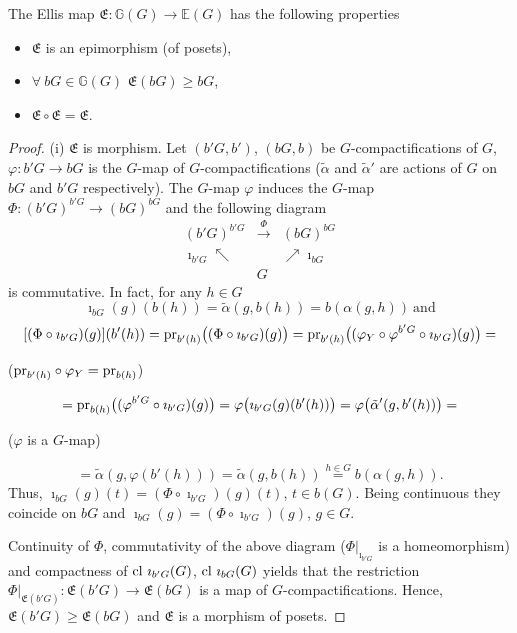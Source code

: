 \documentclass[10pt,a4paper]{amsart}
\newcommand{\cl}{\mbox{{\rm cl}}}
\newcommand{\pr}{\mbox{{\rm pr}}}
\begin{document}
\begin{thm}\label{thm1}
The Ellis map $\mathfrak{E}:\mathbb{G}(G)\to \mathbb{E} (G)$ has the following properties
\begin{itemize}
\item $\mathfrak{E}$ is an epimorphism {\rm(}of posets{\rm)}, 
\item $\forall\ b G\in \mathbb{G} (G)$  $\mathfrak{E}(b G)\geq b G$, 
\item $\mathfrak{E}\circ\mathfrak{E}=\mathfrak{E}$.
\end{itemize}
\end{thm}

\begin{proof}
(i)  $\mathfrak{E}$ is morphism.  Let $(b' G, b')$, $(b G, b)$ be $G$-compactifications of $G$, $\varphi: b' G\to b G$ is the $G$-map of $G$-compactifications ($\tilde\alpha$ and $\tilde\alpha'$ are actions of $G$ on $b G$ and $b' G$ respectively). The $G$-map $\varphi$ induces the $G$-map  $\Phi:  (b' G)^{b' G}\to  (b G)^{b G}$ and the following diagram 
$$\begin{array}{ccl}
(b' G)^{b' G} & \stackrel{\Phi}{\longrightarrow} &  (b G)^{b G} \\
\imath_{b' G} \nwarrow &   &  \nearrow \imath_{b G} \\
 & G & 
\end{array}$$
is commutative.  In fact, for any  $h\in G$ 
$$\imath_{b G} (g)(b(h))=\tilde\alpha (g, b(h))=b(\alpha (g, h))\ \mbox{and}$$ 
$$[(\Phi\circ\imath_{b' G}) (g)] (b'(h))=\pr_{b'(h)}\big((\Phi\circ\imath_{b' G}) (g)\big)=\pr_{b'(h)}\big((\varphi_{Y}\circ\varphi^{b' G}\circ \imath_{b' G})(g)\big)=$$
\centerline{($\pr_{b'(h)}\circ\varphi_{Y}=\pr_{b(h)}$)}
$$=\pr_{b(h)}\big((\varphi^{b' G}\circ \imath_{b' G})(g)\big)=\varphi\big(\imath_{b' G} (g)(b'(h))\big)=\varphi\big(\tilde\alpha'(g, b'(h))\big)=$$
\centerline{($\varphi$ is a $G$-map)} 
$$=\tilde\alpha(g, \varphi (b'(h)))=\tilde\alpha(g, b(h))\stackrel{h\in G}=b(\alpha(g, h)).$$
Thus, $\imath_{b G} (g)(t)=(\Phi\circ\imath_{b' G}) (g)(t)$, $t\in b (G)$.  Being continuous they coincide on $b G$ and  $\imath_{b G} (g)=(\Phi\circ\imath_{b' G}) (g)$, $g\in G$.

Continuity of $\Phi$, commutativity of the above diagram ($\Phi|_{\imath_{b' G}}$ is a homeomorphism) and compactness of $\cl~\imath_{b' G} (G)$, $\cl~\imath_{b G} (G)$ yields that the restriction $\Phi|_{\mathfrak{E}(b' G)}: \mathfrak{E}(b' G)\to \mathfrak{E}(b G)$ is a map of $G$-compactifications. Hence, $\mathfrak{E}(b' G)\geq\mathfrak{E}(b G)$ and $\mathfrak{E}$ is a morphism of posets. 


\end{proof}
\end{document}
